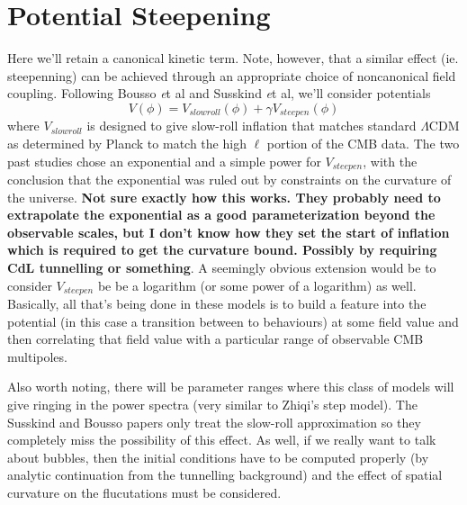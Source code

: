 \documentclass{article}
\begin{document}
\section{Potential Steepening}
Here we'll retain a canonical kinetic term.  Note, however, that a similar effect (ie. steepenning) can be achieved through an appropriate choice of noncanonical field coupling.
Following Bousso {\emph et al} and Susskind {\emph et al}, we'll consider potentials
\begin{equation}
  V(\phi) = V_{slowroll}(\phi) + \gamma V_{steepen}(\phi)
\end{equation}
where $V_{slowroll}$ is designed to give slow-roll inflation that matches standard $\Lambda$CDM as determined by Planck to match the high $\ell$ portion of the CMB data.
The two past studies chose an exponential and a simple power for $V_{steepen}$,
with the conclusion that the exponential was ruled out by constraints on the curvature of the universe.  {\bf Not sure exactly how this works.  They probably need to extrapolate the exponential as a good parameterization beyond the observable scales, but I don't know how they set the start of inflation which is required to get the curvature bound.  Possibly by requiring CdL tunnelling or something}.
A seemingly obvious extension would be to consider $V_{steepen}$ be be a logarithm (or some power of a logarithm) as well.
Basically, all that's being done in these models is to build a feature into the potential (in this case a transition between to behaviours) at some field value and then correlating that field value with a particular range of observable CMB multipoles.

Also worth noting, there will be parameter ranges where this class of models will give ringing in the power spectra (very similar to Zhiqi's step model).
The Susskind and Bousso papers only treat the slow-roll approximation so they completely miss the possibility of this effect.
As well, if we really want to talk about bubbles, then the initial conditions have to be computed properly (by analytic continuation from the tunnelling background) and the effect of spatial curvature on the flucutations must be considered.
\end{document}
